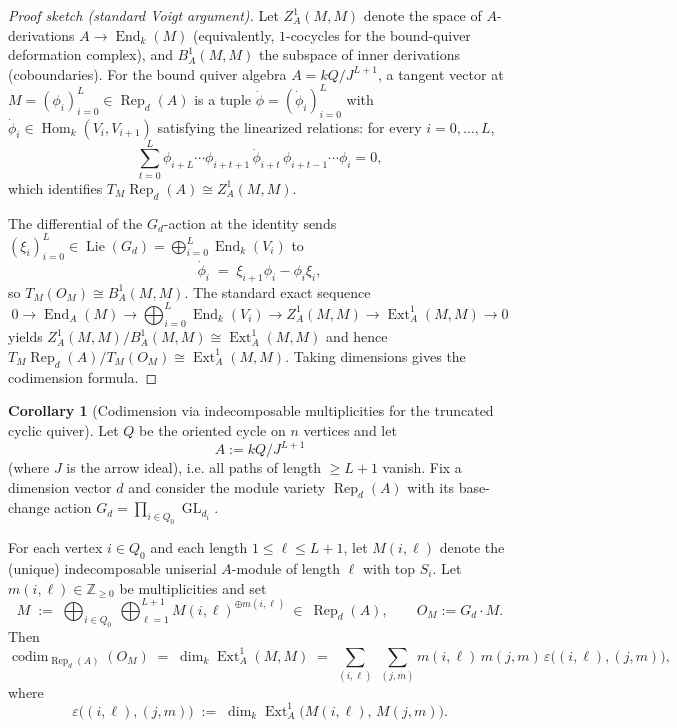 \documentclass{article}
\newcommand{\Hom}{\operatorname{Hom}}
\newcommand{\Rep}{\operatorname{Rep}}
\newcommand{\codim}{\operatorname{codim}}
\newcommand{\Ext}{\operatorname{Ext}}
\newcommand{\End}{\operatorname{End}}
\newcommand{\GL}{\operatorname{GL}}
\newcommand{\Lie}{\operatorname{Lie}}
\theoremstyle{definition}
\newtheorem{corollary}[theorem]{Corollary}
\begin{document}
\begin{proof}[Proof sketch (standard Voigt argument)]
Let $Z^1_A(M,M)$ denote the space of $A$-derivations $A\to \End_k(M)$ (equivalently, $1$-cocycles for the
bound-quiver deformation complex), and $B^1_A(M,M)$ the subspace of inner derivations (coboundaries).
For the bound quiver algebra $A=kQ/J^{L+1}$, a tangent vector at $M=(\phi_i)_{i=0}^{L}\in \Rep_d(A)$ is a
tuple $\dot\phi=(\dot\phi_i)_{i=0}^{L}$ with $\dot\phi_i\in \Hom_k(V_i,V_{i+1})$ satisfying the linearized relations:
for every $i=0,\ldots,L$,
\[
\sum_{t=0}^{L} \phi_{i+L}\cdots \phi_{i+t+1}\,\dot\phi_{i+t}\,\phi_{i+t-1}\cdots \phi_{i}=0,
\]
which identifies $T_M\Rep_d(A)\cong Z^1_A(M,M)$.

The differential of the $G_d$-action at the identity sends $(\xi_i)_{i=0}^{L}\in \Lie(G_d)=\bigoplus_{i=0}^{L} \End_k(V_i)$ to
\[
\dot\phi_i \;=\; \xi_{i+1}\phi_i - \phi_i\xi_i,
\]
so $T_M(O_M)\cong B^1_A(M,M)$. The standard exact sequence
\[
0\to \End_A(M)\to \bigoplus_{i=0}^{L}\End_k(V_i)\to Z^1_A(M,M)\to \Ext^1_A(M,M)\to 0
\]
yields $Z^1_A(M,M)/B^1_A(M,M)\cong \Ext^1_A(M,M)$ and hence
$T_M\Rep_d(A)/T_M(O_M)\cong \Ext^1_A(M,M)$. Taking dimensions gives the codimension formula.
\end{proof}

\begin{corollary}[Codimension via indecomposable multiplicities for the truncated cyclic quiver]
\label{cor:codim_trunc_cycle_ext_bilinear}
Let $Q$ be the oriented cycle on $n$ vertices and let
\[
A := kQ/J^{L+1}
\]
(where $J$ is the arrow ideal), i.e. all paths of length $\ge L+1$ vanish.
Fix a dimension vector $d$ and consider the module variety $\Rep_d(A)$ with its base-change action
$G_d=\prod_{i\in Q_0}\GL_{d_i}$.

For each vertex $i\in Q_0$ and each length $1\le \ell \le L+1$, let $M(i,\ell)$ denote the (unique)
indecomposable uniserial $A$-module of length $\ell$ with top $S_i$.
Let $m(i,\ell)\in\mathbb{Z}_{\ge 0}$ be multiplicities and set
\[
M \;:=\; \bigoplus_{i\in Q_0}\ \bigoplus_{\ell=1}^{L+1} M(i,\ell)^{\oplus m(i,\ell)}\ \in\ \Rep_d(A),
\qquad O_M:=G_d\cdot M.
\]
Then
\[
\codim_{\Rep_d(A)}(O_M)\;=\;\dim_k\Ext^1_A(M,M)
\;=\;\sum_{(i,\ell)}\ \sum_{(j,m)} m(i,\ell)\,m(j,m)\,\varepsilon\big((i,\ell),(j,m)\big),
\]
where
\[
\varepsilon\big((i,\ell),(j,m)\big)\;:=\;\dim_k\Ext^1_A\!\big(M(i,\ell),\,M(j,m)\big).
\]
\end{corollary}
\end{document}
